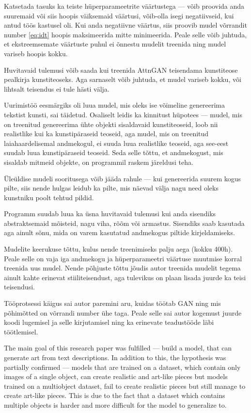 \documentclass{vilgym}
\begin{document}
	Katsetada tasuks ka teiste hüperparameetrite väärtustega --- võib proovida anda suuremaid või siis hoopis väiksemaid väärtusi, võib-olla isegi negatiivseid, kui antud töös kastusel oli. Kui anda negatiivne väärtus, siis proovib mudel võrrandit number \ref{eq:idt} hoopis maksimeerida mitte minimeerida. Peale selle võib juhtuda, et ekstreemsemate väärtuste puhul ei õnnestu mudelit treenida ning mudel variseb hoopis kokku.
	
	Huvitavaid tulemusi võib saada kui treenida AttnGAN teisendama kunstiteose pealkirja kunstiteoseks. Aga sarnaselt võib juhtuda, et mudel variseb kokku, või lihtsalt teisendus ei tule hästi välja.
	
	Uurimistöö eesmärgiks oli luua mudel, mis oleks ise võimeline genereerima tekstist kunsti, sai täidetud. Osaliselt leidis ka kinnitust hüpotees --- mudel, mis on treenitud genereerima ühte objekti sisaldavaid kunstiteoseid, loob nii realistlike kui ka kunstipäraseid teoseid, aga mudel, mis on treenitud laiahaardelisemal andmekogul, ei suuda luua realistlike teoseid, aga see-eest suudab luua kunstipäraseid teoseid. Seda selle tõttu, et andmekogust, mis sisaldab mitmeid objekte, on programmil raskem järeldusi teha.

	Üleüldise mudeli sooritusega võib jääda rahule --- kui genereerida suurem kogus pilte, siis nende hulgas leidub ka pilte, mis näevad välja nagu need oleks kunstniku poolt tehtud pildid. 

	Programm suudab luua ka üsna huvitavaid tulemusi kui anda sisendiks abstraktsemaid mõisteid, nagu viha, rõõm või armastus. Sisendiks saab kasutada aga ainult sõnu, mida on varem kasutatud andmekogus piltide kirjeldamiseks.
	
	Mudelite keerukuse tõttu, kulus nende treenimiseks palju aega (kokku 400h). Peale selle on vaja iga andmekogu ja hüperparameetri väärtuse muutmise korral treenida uus mudel. Nende põhjuste tõttu jõudis autor treenida mudelit tegema ainult kahte erinevat stiiliteisendust, aga tulevikus on plaan lisada juurde ka teisi teisendusi.

	Tööprotsessi käigus sai autor paremini aru, kuidas töötab GAN ning mis põhimõtted on võrrandi number ühe taga. Peale selle sai autor kogemust juurde koodi lugemisel ja selle kirjutamisel ning ka erinevate teadustööde läbi töötlemisel.

    The main goal of this research paper was fulfilled --- build a model, that can generate art from text descriptions. In addition to this, the hypothesis was partially confirmed --- models that are trained on a dataset, which contain only images of a single object, can create realistic and art-like pieces but models trained on a multiobject dataset, fail to create realistic pieces but still manage to create art-like pieces. This is due to the fact that a dataset which contains multiple objects is harder and more difficult for the model to generalize to.   
\end{document}
